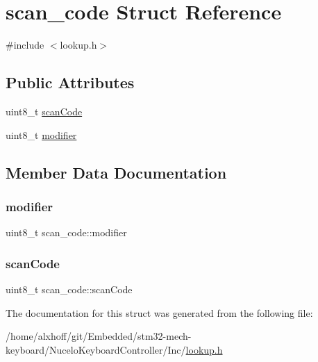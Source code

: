 \hypertarget{structscan__code}{}\section{scan\+\_\+code Struct Reference}
\label{structscan__code}


{\ttfamily \#include $<$lookup.\+h$>$}

\subsection*{Public Attributes}
\begin{DoxyCompactItemize}
\item 
uint8\+\_\+t \hyperlink{structscan__code_ae784a2bd36ec5ba6474a2cb9aab1eef0}{scan\+Code}
\item 
uint8\+\_\+t \hyperlink{structscan__code_a74f6493401f97f69f035263247c3c709}{modifier}
\end{DoxyCompactItemize}


\subsection{Member Data Documentation}
\mbox{\label{structscan__code_a74f6493401f97f69f035263247c3c709}} 
\subsubsection{\texorpdfstring{modifier}{modifier}}
{\footnotesize\ttfamily uint8\+\_\+t scan\+\_\+code\+::modifier}

\mbox{\label{structscan__code_ae784a2bd36ec5ba6474a2cb9aab1eef0}} 
\subsubsection{\texorpdfstring{scan\+Code}{scanCode}}
{\footnotesize\ttfamily uint8\+\_\+t scan\+\_\+code\+::scan\+Code}



The documentation for this struct was generated from the following file\+:\begin{DoxyCompactItemize}
\item 
/home/alxhoff/git/\+Embedded/stm32-\/mech-\/keyboard/\+Nucelo\+Keyboard\+Controller/\+Inc/\hyperlink{lookup_8h}{lookup.\+h}\end{DoxyCompactItemize}
